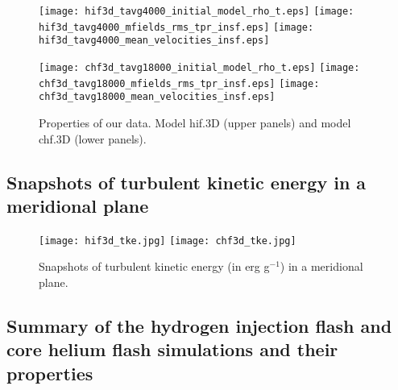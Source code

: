 \documentclass[10pt,paper=a4]{report}
\begin{document}
\begin{figure}[!h]
\centerline{
\texttt{[image: hif3d\_tavg4000\_initial\_model\_rho\_t.eps]}
\texttt{[image: hif3d\_tavg4000\_mfields\_rms\_tpr\_insf.eps]}
\texttt{[image: hif3d\_tavg4000\_mean\_velocities\_insf.eps]}}

\centerline{
\texttt{[image: chf3d\_tavg18000\_initial\_model\_rho\_t.eps]}
\texttt{[image: chf3d\_tavg18000\_mfields\_rms\_tpr\_insf.eps]}
\texttt{[image: chf3d\_tavg18000\_mean\_velocities\_insf.eps]}}
\caption{Properties of our data. Model {\sf hif.3D} (upper panels) and model {\sf chf.3D} (lower panels). \label{fig:data}}
\end{figure}


\newpage

\subsection{Snapshots of turbulent kinetic energy in a meridional plane}

\vspace{1.cm}

\begin{figure}[!h]
\centerline{
\texttt{[image: hif3d\_tke.jpg]}
\texttt{[image: chf3d\_tke.jpg]}}
\caption{Snapshots of turbulent kinetic energy (in erg g$^{-1}$) in a meridional plane.}
\label{fig:ob-rg-tke-cuts}
\end{figure}

\newpage

\subsection{Summary of the hydrogen injection flash and core helium flash simulations and their properties}

\vspace{1.cm}
\end{document}

